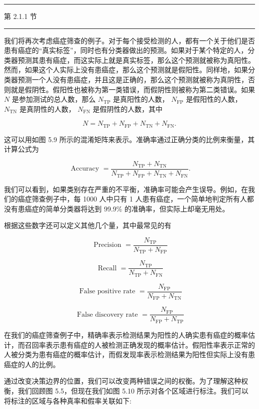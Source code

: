 \documentclass[10pt]{report}
\newcommand{\HRule}{\begin{center}\rule{0.9\linewidth}{0.2mm}\end{center}}
\begin{document}
\HRule

第 2.1.1 节

\HRule

我们将再次考虑癌症筛查的例子。对于每个接受检测的人，都有一个关于他们是否患有癌症的“真实标签”，同时也有分类器做出的预测。如果对于某个特定的人，分类器预测其患有癌症，而这实际上就是真实标签，那么这个预测就被称为真阳性。然而，如果这个人实际上没有患癌症，那么这个预测就是假阳性。同样地，如果分类器预测一个人没有患癌症，并且这是正确的，那么这个预测就被称为真阴性，否则就是假阴性。假阳性也被称为第一类错误，而假阴性则被称为第二类错误。如果 \(N\) 是参加测试的总人数，那么 \({N}_{\mathrm{{TP}}}\) 是真阳性的人数， \({N}_{\mathrm{{FP}}}\) 是假阳性的人数， \({N}_{\mathrm{{TN}}}\) 是真阴性的人数， \({N}_{\mathrm{{FN}}}\) 是假阴性的人数，其中

\[
N = {N}_{\mathrm{{TP}}} + {N}_{\mathrm{{FP}}} + {N}_{\mathrm{{TN}}} + {N}_{\mathrm{{FN}}}. \tag{5.28}
\]

这可以用如图 5.9 所示的混淆矩阵来表示。准确率通过正确分类的比例来衡量，其计算公式为

\[
\text{ Accuracy } = \frac{{N}_{\mathrm{{TP}}} + {N}_{\mathrm{{TN}}}}{{N}_{\mathrm{{TP}}} + {N}_{\mathrm{{FP}}} + {N}_{\mathrm{{TN}}} + {N}_{\mathrm{{FN}}}}. \tag{5.29}
\]

我们可以看到，如果类别存在严重的不平衡，准确率可能会产生误导。例如，在我们的癌症筛查例子中，每 1000 人中只有 1 人患有癌症，一个简单地判定所有人都没有患癌症的简单分类器将达到 99.9\% 的准确率，但实际上却毫无用处。

根据这些数字还可以定义其他几个量，其中最常见的有

\[
\text{ Precision } = \frac{{N}_{\mathrm{{TP}}}}{{N}_{\mathrm{{TP}}} + {N}_{\mathrm{{FP}}}} \tag{5.30}
\]

\[
\text{ Recall } = \frac{{N}_{\mathrm{{TP}}}}{{N}_{\mathrm{{TP}}} + {N}_{\mathrm{{FN}}}} \tag{5.31}
\]

\[
\text{ False positive rate } = \frac{{N}_{\mathrm{{FP}}}}{{N}_{\mathrm{{FP}}} + {N}_{\mathrm{{TN}}}} \tag{5.32}
\]

\[
\text{ False discovery rate } = \frac{{N}_{\mathrm{{FP}}}}{{N}_{\mathrm{{FP}}} + {N}_{\mathrm{{TP}}}} \tag{5.33}
\]

在我们的癌症筛查例子中，精确率表示检测结果为阳性的人确实患有癌症的概率估计，而召回率表示患有癌症的人被检测正确发现的概率估计。假阳性率表示正常的人被分类为患有癌症的概率估计，而假发现率表示检测结果为阳性但实际上没有患癌症的人的比例。

通过改变决策边界的位置，我们可以改变两种错误之间的权衡。为了理解这种权衡，我们回顾图 5.5，但现在我们如图 5.10 所示对各个区域进行标注。我们可以将标注的区域与各种真率和假率关联如下:
\end{document}
